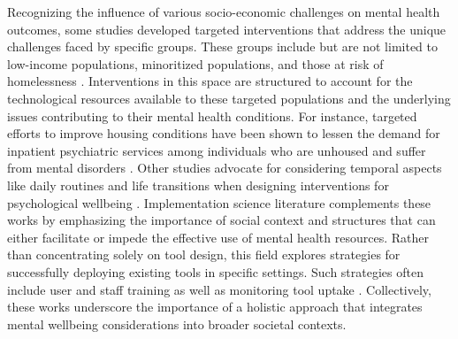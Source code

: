 Recognizing the influence of various socio-economic challenges on mental health outcomes, some studies developed targeted interventions that address the unique challenges faced by specific groups. These groups include but are not limited to low-income populations, minoritized populations, and those at risk of homelessness \cite{aubry2016multiple, kerman2018effects, leung2015household, murnane2018personal, sallis2015ecological, li2010stage, schueller2019use}. Interventions in this space are structured to account for the technological resources available to these targeted populations and the underlying issues contributing to their mental health conditions. 
For instance, targeted efforts to improve housing conditions have been shown to lessen the demand for inpatient psychiatric services among individuals who are unhoused and suffer from mental disorders \cite{kerman2018effects}. %
Other studies advocate for considering temporal aspects like daily routines and life transitions when designing interventions for psychological wellbeing \cite{doherty2010fieldwork, murnane2018personal, reddy2006temporality, jung2023enjoy, bhattacharjee2023investigating}. Implementation science literature \cite{graham2020implementation, urquhart2020defining, powell2015refined} complements these works by emphasizing the importance of social context and structures that can either facilitate or impede the effective use of mental health resources. Rather than concentrating solely on tool design, this field explores strategies for successfully deploying existing tools in specific settings. Such strategies often include user and staff training as well as monitoring tool uptake \cite{powell2015refined, powell2012compilation}. Collectively, these works underscore the importance of a holistic approach that integrates mental wellbeing considerations into broader societal contexts. 



